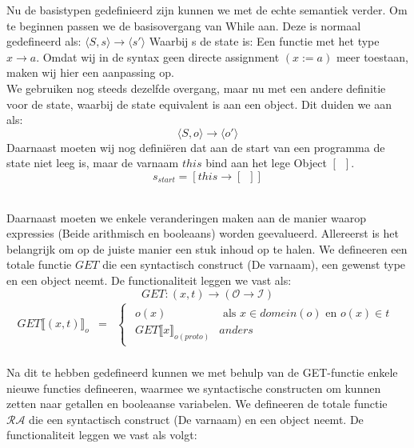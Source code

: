 \documentclass[12pt]{article}
\newcommand{\RA}{\mathcal{RA}}
\begin{document}
Nu de basistypen gedefinieerd zijn kunnen we met de echte semantiek verder. Om te beginnen passen we de basisovergang van While aan. Deze is normaal gedefineerd als:
$ \langle S,s \rangle \rightarrow \langle s\prime \rangle $
Waarbij s de state is: Een functie met het type
$ x \rightarrow a $.
Omdat wij in de syntax geen directe assignment $(x := a)$ meer toestaan, maken wij hier een aanpassing op.\\
We gebruiken nog steeds dezelfde overgang, maar nu met een andere definitie voor de state, waarbij de state equivalent is aan een object. Dit duiden we aan als:
$$ \langle S,o \rangle \rightarrow \langle o\prime \rangle $$
Daarnaast moeten wij nog definiëren dat aan de start van een programma de state niet leeg is, maar de varnaam $ this $ bind aan het lege Object $ [\enspace] $.
$$ s_{start} = [this \rightarrow [\enspace]]$$
\\
\par
Daarnaast moeten we enkele veranderingen maken aan de manier waarop expressies (Beide arithmisch en booleaans) worden geevalueerd. 
Allereerst is het belangrijk om op de juiste manier een stuk inhoud op te halen. We defineeren een totale functie $ GET $ die een syntactisch construct (De varnaam), een gewenst type en een object neemt. De functionaliteit leggen we vast als:
\[ GET: (x,t) \rightarrow (\mathcal{O} \rightarrow \mathcal{I}) \]
\[
\begin{matrix}
GET\llbracket (x,t) \rrbracket_o & = & 
\begin{cases}
\begin{matrix}
o(x) & \mbox{ als } x \in domein(o) \mbox{ en } o(x) \in t\\
GET\llbracket x \rrbracket_{o(proto)} & anders
\end{matrix}
\end{cases}\\
\end{matrix}
\]

Na dit te hebben gedefineerd kunnen we met behulp van de GET-functie enkele nieuwe functies defineeren, waarmee we syntactische constructen om kunnen zetten naar getallen en booleaanse variabelen. We defineeren de totale functie $ \RA $ die een syntactisch construct (De varnaam) en een object neemt. De functionaliteit leggen we vast als volgt:
\end{document}
